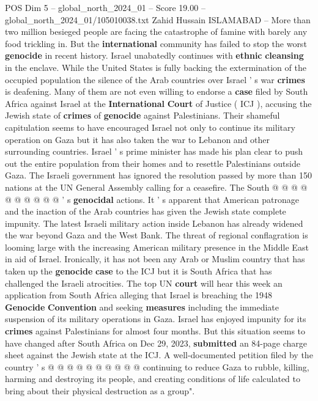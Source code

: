 \begin{textsample}{POS Dim 5 – global\_north\_2024\_01 – Score 19.00 – global\_north\_2024\_01/105010038.txt}  \label{ex:f5_pos_134}
Zahid Hussain ISLAMABAD -- More than two million besieged people are facing the catastrophe of famine with barely any food trickling in.
But the \textbf{international} community has failed to stop the worst \textbf{genocide} in recent history.
Israel unabatedly continues with \textbf{ethnic} \textbf{cleansing} in the enclave.
While the United States is fully backing the extermination of the occupied population the silence of the Arab countries over Israel ' s war \textbf{crimes} is deafening.
Many of them are not even willing to endorse a \textbf{case} filed by South Africa against Israel at the \textbf{International} \textbf{Court} of Justice ( ICJ ), accusing the Jewish state of \textbf{crimes} of \textbf{genocide} against Palestinians.
Their shameful capitulation seems to have encouraged Israel not only to continue its military operation on Gaza but it has also taken the war to Lebanon and other surrounding countries.
Israel ' s prime minister has made his plan clear to push out the entire population from their homes and to resettle Palestinians outside Gaza.
The Israeli government has ignored the resolution passed by more than 150 nations at the UN General Assembly calling for a ceasefire.
The South @ @ @ @ @ @ @ @ @ @ ' s \textbf{genocidal} actions.
It ' s apparent that American patronage and the inaction of the Arab countries has given the Jewish state complete impunity.
The latest Israeli military action inside Lebanon has already widened the war beyond Gaza and the West Bank.
The threat of regional conflagration is looming large with the increasing American military presence in the Middle East in aid of Israel.
Ironically, it has not been any Arab or Muslim country that has taken up the \textbf{genocide} \textbf{case} to the ICJ but it is South Africa that has challenged the Israeli atrocities.
The top UN \textbf{court} will hear this week an application from South Africa alleging that Israel is breaching the 1948 \textbf{Genocide} \textbf{Convention} and seeking \textbf{measures} including the immediate suspension of its military operations in Gaza.
Israel has enjoyed impunity for its \textbf{crimes} against Palestinians for almost four months.
But this situation seems to have changed after South Africa on Dec 29, 2023, \textbf{submitted} an 84-page charge sheet against the Jewish state at the ICJ.
A well-documented petition filed by the country ' s @ @ @ @ @ @ @ @ @ @ continuing to reduce Gaza to rubble, killing, harming and destroying its people, and creating conditions of life calculated to bring about their physical destruction as a group".

\end{textsample}
